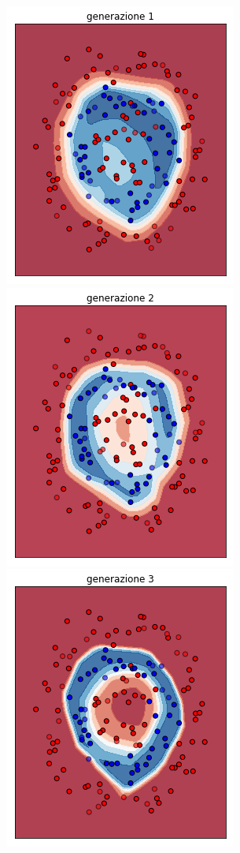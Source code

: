 \documentclass[12pt,a4paper]{report}
\begin{document}
\begin{figure}[H]
 \centering
 \includegraphics[scale = 0.35]{images/circle+-rnd-acc./1}
 \includegraphics[scale = 0.35]{images/circle+-rnd-acc./2}
 \includegraphics[scale = 0.35]{images/circle+-rnd-acc./3}

\end{figure}
\end{document}
